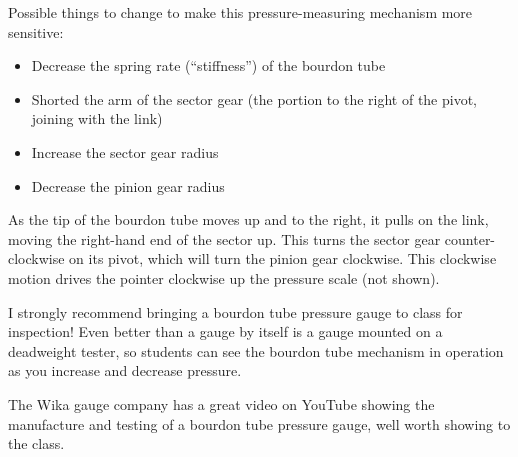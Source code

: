 Possible things to change to make this pressure-measuring mechanism more sensitive:

\begin{itemize}
\item{} Decrease the spring rate (``stiffness'') of the bourdon tube
\item{} Shorted the arm of the sector gear (the portion to the right of the pivot, joining with the link)
\item{} Increase the sector gear radius
\item{} Decrease the pinion gear radius
\end{itemize}







As the tip of the bourdon tube moves up and to the right, it pulls on the link, moving the right-hand end of the sector up.  This turns the sector gear counter-clockwise on its pivot, which will turn the pinion gear clockwise.  This clockwise motion drives the pointer clockwise up the pressure scale (not shown).

I strongly recommend bringing a bourdon tube pressure gauge to class for inspection!  Even better than a gauge by itself is a gauge mounted on a deadweight tester, so students can see the bourdon tube mechanism in operation as you increase and decrease pressure.

\vskip 10pt

The Wika gauge company has a great video on YouTube showing the manufacture and testing of a bourdon tube pressure gauge, well worth showing to the class.




